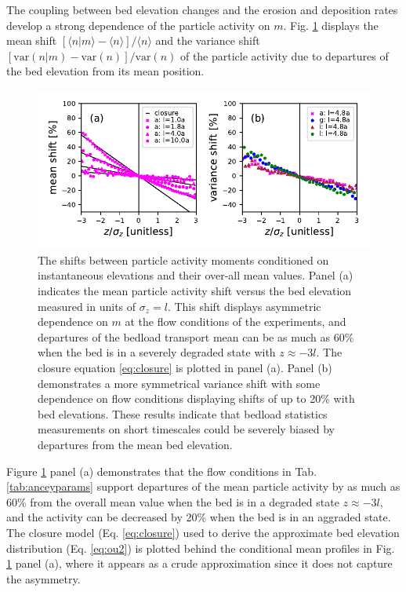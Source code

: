 The coupling between bed elevation changes and the erosion and deposition rates develop a strong dependence of the particle activity on $m$. Fig. \ref{fig:condmoms} displays the mean shift $[\langle n |m \rangle - \langle n \rangle]/\langle n \rangle $ and the variance shift  $[\text{var}(n|m) - \text{var}(n)]/\text{var}(n)$ of the particle activity due to departures of the bed elevation from its mean position.
\begin{figure}[!htbp]
	\includegraphics[width=\linewidth,keepaspectratio]{./figures/ch3/momentsuppression.pdf}
	\caption{The shifts between particle activity moments conditioned on instantaneous elevations and their over-all mean values. Panel (a) indicates the mean particle activity shift versus the bed elevation measured in units of $\sigma_z=l$. This shift displays asymmetric dependence on $m$ at the flow conditions of the \citet{Ancey2008} experiments, and departures of the bedload transport mean can be as much as 60\% when the bed is in a severely degraded state with $z\approx -3l$. The closure equation \ref{eq:closure} is plotted in panel (a). Panel (b) demonstrates a more symmetrical variance shift with some dependence on flow conditions displaying shifts of up to 20\% with bed elevations. These results indicate that bedload statistics measurements on short timescales could be severely biased by departures from the mean bed elevation.}
	\label{fig:condmoms}
\end{figure}
Figure \ref{fig:condmoms} panel (a) demonstrates that the flow conditions in Tab. \ref{tab:anceyparams} support departures of the mean particle activity by as much as 60\% from the overall mean value when the bed is in a degraded state $z\approx -3l$, and the activity can be decreased by 20\% when the bed is in an aggraded state.
The closure model (Eq. \ref{eq:closure}) used to derive the approximate bed elevation distribution (Eq. \ref{eq:ou2}) is plotted behind the conditional mean profiles in Fig. \ref{fig:condmoms} panel (a), where it appears as a crude approximation since it does not capture the asymmetry.
